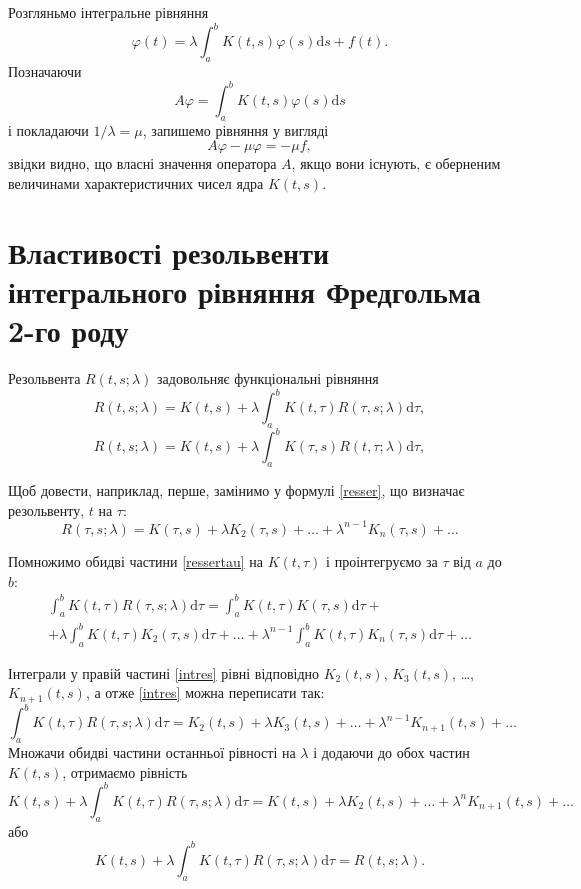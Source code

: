 \documentclass[14pt,twoside]{extreport}
\theoremstyle{mystyle}
\numberwithin{equation}{chapter}
\begin{document}
Розгляньмо інтегральне рівняння
\[
\varphi(t)=\lambda\int_{a}^{b} K(t,s) \varphi(s)\mathrm{d}s + f(t).
\]
Позначаючи
\[
 A\varphi=\int_{a}^{b} K(t,s) \varphi(s)\mathrm{d}s
\]
і покладаючи $1/\lambda = \mu$, запишемо рівняння у вигляді
\[
 A\varphi - \mu \varphi = - \mu f,
\]
звідки видно, що власні значення оператора $A$, якщо вони існують, є оберненим величинами характеристичних чисел ядра $K(t, s)$.

\chapter{Властивості резольвенти інтегрального рівняння Фредгольма 2-го роду}

Резольвента $R(t, s; \lambda)$ задовольняє функціональні рівняння
\begin{equation}\label{reseq1}
 R(t, s; \lambda) = K(t, s) + \lambda \int_{a}^{b} K(t, \tau) R(\tau, s; \lambda) \mathrm{d}\tau,
\end{equation}
\begin{equation}\label{reseq2}
 R(t, s; \lambda) = K(t, s) + \lambda \int_{a}^{b} K(\tau, s) R(t, \tau; \lambda) \mathrm{d}\tau,
\end{equation}

Щоб довести, наприклад, перше, замінимо у формулі \eqref{resser}, що визначає резольвенту, $t$ на $\tau$:
\begin{equation}\label{ressertau}
 R(\tau, s; \lambda) = K(\tau, s) + \lambda K_2(\tau, s) + \ldots + \lambda^{n-1} K_n(\tau, s) + \ldots
\end{equation}

Помножимо обидві частини \eqref{ressertau} на $K(t, \tau)$ і проінтегруємо за $\tau$ від $a$ до $b$:
\begin{multline}\label{intres}
  \displaystyle\int_{a}^{b} K(t, \tau) R(\tau, s; \lambda) \mathrm{d}\tau = \displaystyle\int_{a}^{b} K(t, \tau) K(\tau, s) \mathrm{d}\tau +\\
  +\lambda \int_{a}^{b} K(t, \tau) K_2(\tau, s) \mathrm{d}\tau+\ldots+\lambda^{n-1}\int_{a}^{b} K(t, \tau) K_n(\tau, s) \mathrm{d}\tau+\ldots
\end{multline}

Інтеграли у правій частині \eqref{intres} рівні відповідно $K_2(t, s)$, $K_3(t, s)$, \ldots, $K_{n+1}(t, s)$, а отже \eqref{intres} можна переписати так:
\[
 \displaystyle\int_{a}^{b} K(t, \tau) R(\tau, s; \lambda) \mathrm{d}\tau = K_2(t, s) +\lambda K_3(t, s) +\ldots+\lambda^{n-1} K_{n+1}(t, s)+\ldots
\]
Множачи обидві частини останньої рівності на $\lambda$ і додаючи до обох частин $K(t, s)$, отримаємо рівність
\[
 \displaystyle K(t, s) +\lambda \int_{a}^{b} K(t, \tau) R(\tau, s; \lambda) \mathrm{d}\tau = K(t, s) + \lambda K_2(t, s) +\ldots+\lambda^n K_{n+1}(t, s)+\ldots
\]
або
\[
 K(t,s) +\lambda \int_{a}^{b} K(t, \tau) R(\tau, s; \lambda) \mathrm{d}\tau = R(t,s; \lambda).
\]
\end{document}

